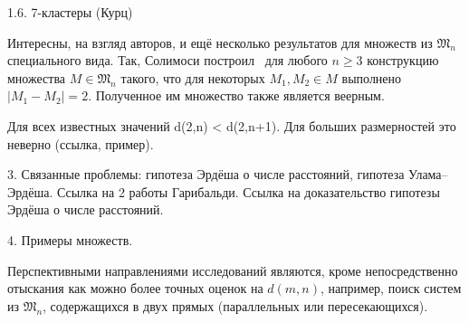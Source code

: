 1.6. 7-кластеры (Курц)


Интересны, на взгляд авторов, и ещё несколько результатов для множеств из $\mathfrak{M}_n$ специального вида.
Так, Солимоси построил~\cite{solymosi2003note} для любого $n\geq 3$ конструкцию множества $M\in\mathfrak{M}_n$
такого, что для некоторых $M_1, M_2 \in M$ выполнено $|M_1 - M_2| = 2$.
Полученное им множество также является веерным.

Для всех известных значений d(2,n) < d(2,n+1).
Для больших размерностей это неверно (ссылка, пример).


3. Связанные проблемы: гипотеза Эрдёша о числе расстояний, гипотеза Улама--Эрдёша.
Ссылка на 2 работы Гарибальди. Ссылка на доказательство гипотезы Эрдёша о числе расстояний.

4. Примеры множеств.



Перспективными направлениями исследований являются, кроме непосредственно отыскания как можно более точных оценок на $d(m,n)$,
например, поиск систем из $\mathfrak{M}_n$, содержащихся в двух прямых (параллельных или пересекающихся).
